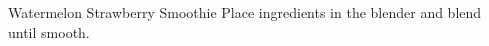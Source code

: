 \documentclass[../cookbook.tex]{subfiles}
\begin{document}
\begin{recipe}{Watermelon Strawberry Smoothie}{}{}
    Place ingredients in the blender and blend until smooth.

\end{recipe}
\end{document}
